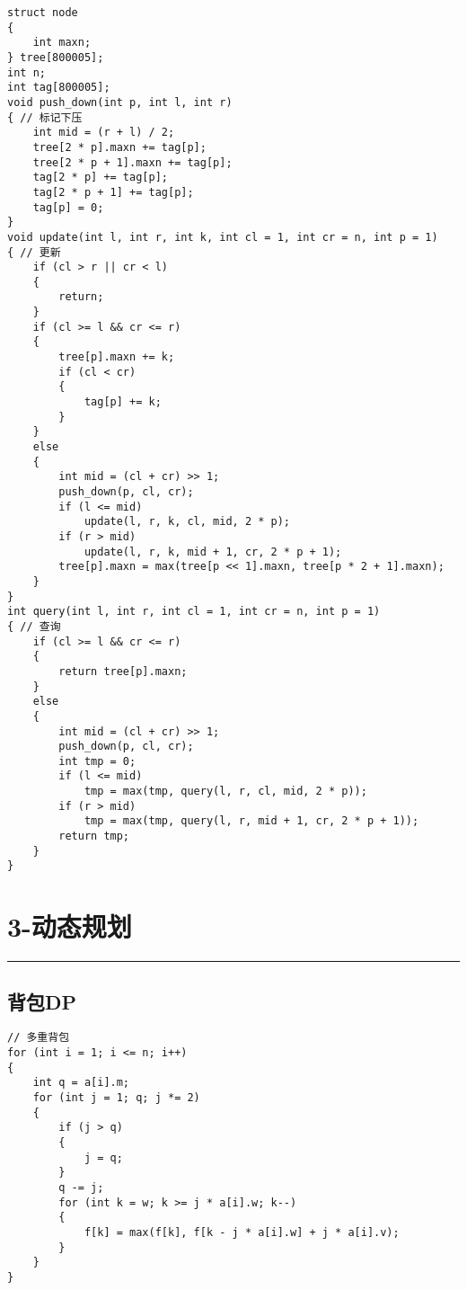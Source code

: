 \documentclass[]{article}
\begin{document}
\begin{verbatim}
struct node
{
    int maxn;
} tree[800005];
int n;
int tag[800005];
void push_down(int p, int l, int r)
{ // 标记下压
    int mid = (r + l) / 2;
    tree[2 * p].maxn += tag[p];
    tree[2 * p + 1].maxn += tag[p];
    tag[2 * p] += tag[p];
    tag[2 * p + 1] += tag[p];
    tag[p] = 0;
}
void update(int l, int r, int k, int cl = 1, int cr = n, int p = 1)
{ // 更新
    if (cl > r || cr < l)
    {
        return;
    }
    if (cl >= l && cr <= r)
    {
        tree[p].maxn += k;
        if (cl < cr)
        {
            tag[p] += k;
        }
    }
    else
    {
        int mid = (cl + cr) >> 1;
        push_down(p, cl, cr);
        if (l <= mid)
            update(l, r, k, cl, mid, 2 * p);
        if (r > mid)
            update(l, r, k, mid + 1, cr, 2 * p + 1);
        tree[p].maxn = max(tree[p << 1].maxn, tree[p * 2 + 1].maxn);
    }
}
int query(int l, int r, int cl = 1, int cr = n, int p = 1)
{ // 查询
    if (cl >= l && cr <= r)
    {
        return tree[p].maxn;
    }
    else
    {
        int mid = (cl + cr) >> 1;
        push_down(p, cl, cr);
        int tmp = 0;
        if (l <= mid)
            tmp = max(tmp, query(l, r, cl, mid, 2 * p));
        if (r > mid)
            tmp = max(tmp, query(l, r, mid + 1, cr, 2 * p + 1));
        return tmp;
    }
}
\end{verbatim}

\hypertarget{ux52a8ux6001ux89c4ux5212}{%
\section{3-动态规划}\label{ux52a8ux6001ux89c4ux5212}}

\begin{center}\rule{0.5\linewidth}{0.5pt}\end{center}

\hypertarget{ux80ccux5305dp}{%
\subsection{背包DP}\label{ux80ccux5305dp}}

\begin{verbatim}
// 多重背包
for (int i = 1; i <= n; i++)
{
    int q = a[i].m;
    for (int j = 1; q; j *= 2)
    {
        if (j > q)
        {
            j = q;
        }
        q -= j;
        for (int k = w; k >= j * a[i].w; k--)
        {
            f[k] = max(f[k], f[k - j * a[i].w] + j * a[i].v);
        }
    }
}
\end{verbatim}
\end{document}
